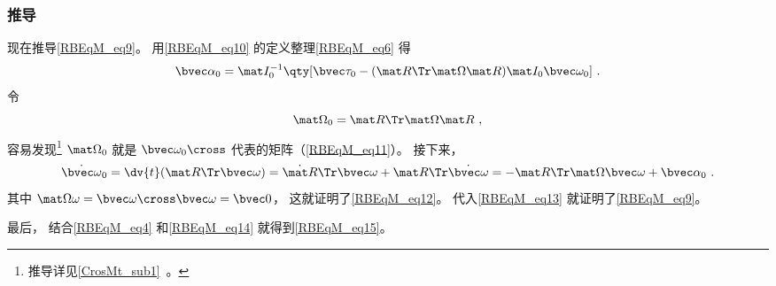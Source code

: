 \subsubsection{推导}
现在推导\autoref{RBEqM_eq9}。 用\autoref{RBEqM_eq10} 的定义整理\autoref{RBEqM_eq6} 得
\begin{equation}\label{RBEqM_eq13}
\bvec\alpha_0 = \mat I_0^{-1} \qty[\bvec \tau_0  - (\mat R\Tr\mat\Omega\mat R) \mat I_0 \bvec\omega_0]~.
\end{equation}
令
\begin{equation}\label{RBEqM_eq14}
\mat\Omega_0 = \mat R\Tr\mat\Omega\mat R~,
\end{equation}
容易发现\footnote{推导详见\autoref{CrosMt_sub1}~。} $\mat\Omega_0$ 就是 $\bvec\omega_0\cross$ 代表的矩阵（\autoref{RBEqM_eq11}）。 接下来，
\begin{equation}
\dot{\bvec\omega}_0
= \dv{t}(\mat R\Tr \bvec\omega)
= \dot{\mat R}\Tr \bvec\omega + {\mat R}\Tr \dot{\bvec\omega}
= -\mat R\Tr\mat\Omega\bvec\omega + \bvec\alpha_0~.
\end{equation}
其中 $\mat\Omega\omega = \bvec\omega\cross\bvec\omega = \bvec 0$， 这就证明了\autoref{RBEqM_eq12}。 代入\autoref{RBEqM_eq13} 就证明了\autoref{RBEqM_eq9}。

最后， 结合\autoref{RBEqM_eq4} 和\autoref{RBEqM_eq14} 就得到\autoref{RBEqM_eq15}。
